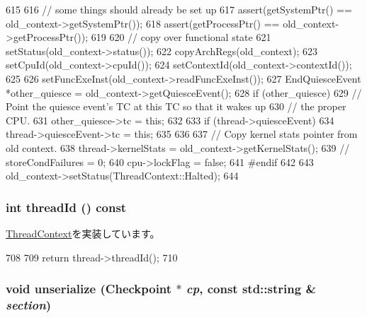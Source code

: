 \begin{DoxyCode}
615 {
616     // some things should already be set up
617     assert(getSystemPtr() == old_context->getSystemPtr());
618     assert(getProcessPtr() == old_context->getProcessPtr());
619 
620     // copy over functional state
621     setStatus(old_context->status());
622     copyArchRegs(old_context);
623     setCpuId(old_context->cpuId());
624     setContextId(old_context->contextId());
625 
626     setFuncExeInst(old_context->readFuncExeInst());
627     EndQuiesceEvent *other_quiesce = old_context->getQuiesceEvent();
628     if (other_quiesce) {
629         // Point the quiesce event's TC at this TC so that it wakes up
630         // the proper CPU.
631         other_quiesce->tc = this;
632     }
633     if (thread->quiesceEvent) {
634         thread->quiesceEvent->tc = this;
635     }
636 
637     // Copy kernel stats pointer from old context.
638     thread->kernelStats = old_context->getKernelStats();
639 //    storeCondFailures = 0;
640     cpu->lockFlag = false;
641 #endif
642 
643     old_context->setStatus(ThreadContext::Halted);
644 }
\end{DoxyCode}
\hypertarget{classOzoneCPU_1_1OzoneTC_afc38d04c77e7b5fc3bbb0dd00fc87742}{
\subsubsection[{threadId}]{\setlength{\rightskip}{0pt plus 5cm}int threadId () const}}
\label{classOzoneCPU_1_1OzoneTC_afc38d04c77e7b5fc3bbb0dd00fc87742}


\hyperlink{classThreadContext_a79882224329589b18076ee3f2f45d99f}{ThreadContext}を実装しています。


\begin{DoxyCode}
708 {
709     return thread->threadId();
710 }
\end{DoxyCode}
\hypertarget{classOzoneCPU_1_1OzoneTC_af22e5d6d660b97db37003ac61ac4ee49}{
\subsubsection[{unserialize}]{\setlength{\rightskip}{0pt plus 5cm}void unserialize ({\bf Checkpoint} $\ast$ {\em cp}, \/  const std::string \& {\em section})}}
\label{classOzoneCPU_1_1OzoneTC_af22e5d6d660b97db37003ac61ac4ee49}




